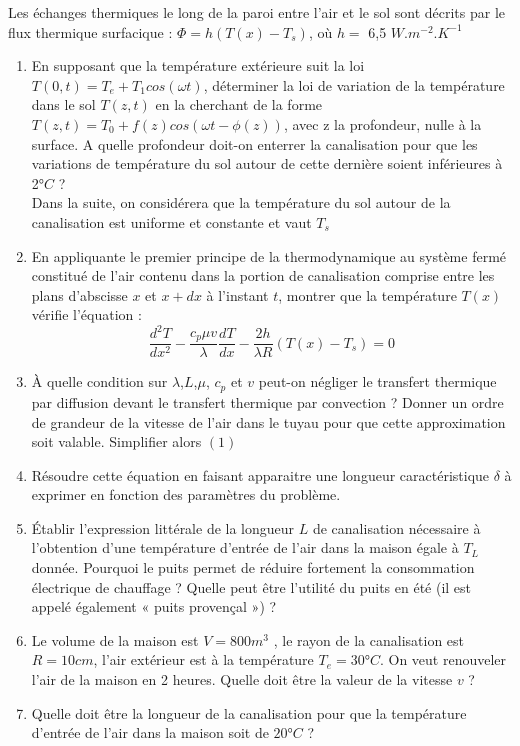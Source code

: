 \documentclass{article}
\begin{document}
Les échanges thermiques le long de la paroi entre l’air et le sol sont décrits par le flux thermique surfacique : $\Phi = h(T(x)-T_s)$, où $h=$ 6,5 $W.m^{-2}.K^{-1}$
\begin{enumerate}
    \item En supposant que la température extérieure suit la loi $T(0,t) = T_e + T_1 cos(\omega t)$, déterminer la loi de variation de la température dans le sol $T(z,t)$ en la cherchant de la forme $T(z,t) = T_0 + f(z)cos(\omega t - \phi(z))$, avec z la profondeur, nulle à la surface. A quelle profondeur doit-on enterrer la canalisation pour que les variations de température du sol autour de cette dernière soient inférieures à 2°$C$ ? 
    \\
    Dans la suite, on considérera  que la température du sol autour de la canalisation est uniforme et constante et vaut $T_s$
    \item En appliquante le premier principe de la thermodynamique au système fermé constitué de l'air contenu dans la portion de canalisation comprise entre les plans d'abscisse $x$ et $x+dx$ à l'instant $t$, montrer que la température $T(x)$ vérifie l'équation : 
    \begin{equation}
        \frac{d^2T}{dx^2} - \frac{c_p \mu v}{\lambda} \frac{dT}{dx} - \frac{2h}{\lambda R} (T(x)-T_s)=0
    \end{equation}
    \item À quelle condition sur $\lambda$,$L$,$\mu$, $c_p$ et $v$ peut-on  négliger le transfert thermique par diffusion devant le transfert thermique par convection  ? Donner un ordre de grandeur de la vitesse de l'air dans le tuyau pour que cette approximation soit valable. Simplifier alors $(1)$
    \item Résoudre cette équation en faisant apparaitre une longueur caractéristique $\delta$ à exprimer en
fonction des paramètres du problème. 
\item  Établir l’expression littérale de la longueur $L $ de canalisation nécessaire à l’obtention d’une
température d’entrée de l’air dans la maison égale à $T_L$ donnée. Pourquoi le puits permet de
réduire fortement la consommation électrique de chauffage ? Quelle peut être l’utilité du puits
en été (il est appelé également « puits provençal ») ? 
\item  Le volume de la maison est $V = 800 m^3$ , le rayon de la canalisation est $R = 10 cm$, l'air
extérieur est à la température $T_e = 30$°$C$. On veut renouveler l’air de la maison en 2 heures.
Quelle doit être la valeur de la vitesse $ v$ ? 
\item Quelle doit être la longueur de la canalisation pour que la température d’entrée de l’air
dans la maison soit de $20$°$C $ ? \\[1cm]
\end{enumerate}
\end{document}
